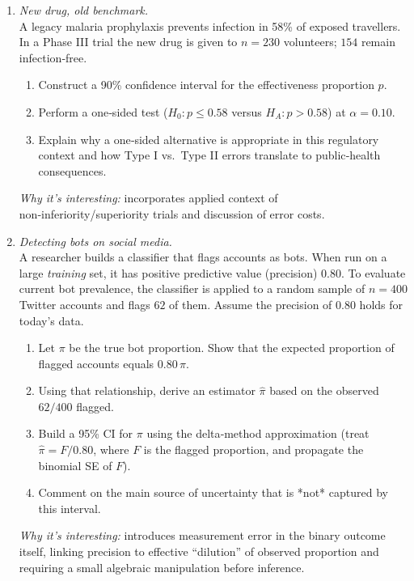 \documentclass[11pt]{article}
\begin{document}
\begin{enumerate}[label=\textbf{Q\,\arabic*:}, left=0pt]
\item  \emph{New drug, old benchmark.}  \\
      A legacy malaria prophylaxis prevents infection in 58\% of exposed travellers.  
      In a Phase III trial the new drug is given to $n=230$ volunteers; $154$ remain infection‑free.  
      \begin{enumerate}[label=(\alph*)]
         \item Construct a 90\% confidence interval for the effectiveness proportion $p$.  
         \item Perform a one‑sided test ($H_0{:}p\le0.58$ versus $H_A{:}p>0.58$) at $\alpha=0.10$.  
         \item Explain why a one‑sided alternative is appropriate in this regulatory context and how Type I vs.\ Type II errors translate to public‑health consequences.
      \end{enumerate}
      \textit{Why it’s interesting:}  incorporates applied context of non‑inferiority/superiority trials and discussion of error costs.  

\item  \emph{Detecting bots on social media.}  \\
      A researcher builds a classifier that flags accounts as bots.  
      When run on a large \emph{training} set, it has positive predictive value (precision) 0.80.  
      To evaluate current bot prevalence, the classifier is applied to a random sample of $n=400$ Twitter accounts and flags $62$ of them.  
      Assume the precision of 0.80 holds for today’s data.  
      \begin{enumerate}[label=(\alph*)]
         \item Let $\pi$ be the true bot proportion.  Show that the expected proportion of flagged accounts equals $0.80\,\pi$.  
         \item Using that relationship, derive an estimator $\widehat{\pi}$ based on the observed $62/400$ flagged.  
         \item Build a 95\% CI for $\pi$ using the delta‐method approximation (treat $\widehat{\pi}=F/0.80$, where $F$ is the flagged proportion, and propagate the binomial SE of $F$).  
         \item Comment on the main source of uncertainty that is *not* captured by this interval.
      \end{enumerate}
      \textit{Why it’s interesting:}  introduces measurement error in the binary outcome itself, linking precision to effective “dilution” of observed proportion and requiring a small algebraic manipulation before inference.  

\end{enumerate}
\end{document}
